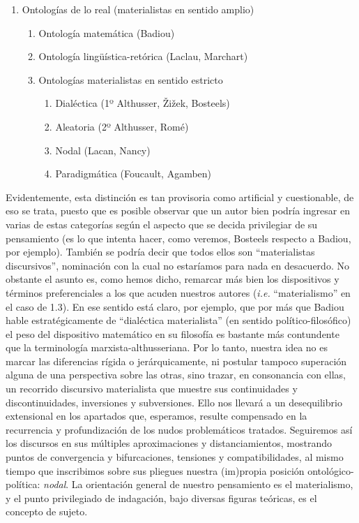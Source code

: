 \begin{enumerate}
\def\labelenumi{\arabic{enumi}.}
\item Ontologías de lo real (materialistas en sentido amplio)
\begin{enumerate}
\def\labelenumii{\arabic{enumi}.\arabic{enumii}}
\item Ontología matemática (Badiou)
\item Ontología lingüística-retórica (Laclau, Marchart)
\item Ontologías materialistas en sentido estricto
\begin{enumerate}
\def\labelenumiii{\arabic{enumi}.\arabic{enumii}.\arabic{enumiii}}
\item Dialéctica (1º Althusser, Žižek, Bosteels)
\item Aleatoria (2º Althusser, Romé)
\item Nodal (Lacan, Nancy)
\item Paradigmática (Foucault, Agamben)
\end{enumerate}
\end{enumerate}
\end{enumerate}

Evidentemente, esta distinción es tan provisoria como artificial y cuestionable, de eso se trata, puesto que es posible observar que un autor bien podría ingresar en varias de estas categorías según el aspecto que se decida privilegiar de su pensamiento (es lo que intenta hacer, como veremos, Bosteels respecto a Badiou, por ejemplo). También se podría decir que todos ellos son \enquote{materialistas discursivos}, nominación con la cual no estaríamos para nada en desacuerdo. No obstante el asunto es, como hemos dicho, remarcar más bien los dispositivos y términos preferenciales a los que acuden nuestros autores (\emph{i.e.} \enquote{materialismo} en el caso de 1.3). En ese sentido está claro, por ejemplo, que por más que Badiou hable estratégicamente de \enquote{dialéctica materialista} (en sentido político-filosófico) el peso del dispositivo matemático en su filosofía es bastante más contundente que la terminología marxista-althusseriana. Por lo tanto, nuestra idea no es marcar las diferencias rígida o jerárquicamente, ni postular tampoco superación alguna de una perspectiva sobre las otras, sino trazar, en consonancia con ellas, un recorrido discursivo materialista que muestre sus continuidades y discontinuidades, inversiones y subversiones. Ello nos llevará a un desequilibrio extensional en los apartados que, esperamos, resulte compensado en la recurrencia y profundización de los nudos problemáticos tratados. Seguiremos así los discursos en sus múltiples aproximaciones y distanciamientos, mostrando puntos de convergencia y bifurcaciones, tensiones y compatibilidades, al mismo tiempo que inscribimos sobre sus pliegues nuestra (im)propia posición ontológico-política: \emph{nodal}. La orientación general de nuestro pensamiento es el materialismo, y el punto privilegiado de indagación, bajo diversas figuras teóricas, es el concepto de sujeto.

